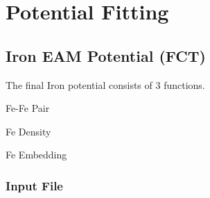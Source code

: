 \chapter{Potential Fitting}







%

\section{Iron EAM Potential (FCT)}

The final Iron potential consists of 3 functions.

\begin{list}
\item Fe-Fe Pair
\item Fe Density
\item Fe Embedding
\end{list}



\subsection{Input File}


